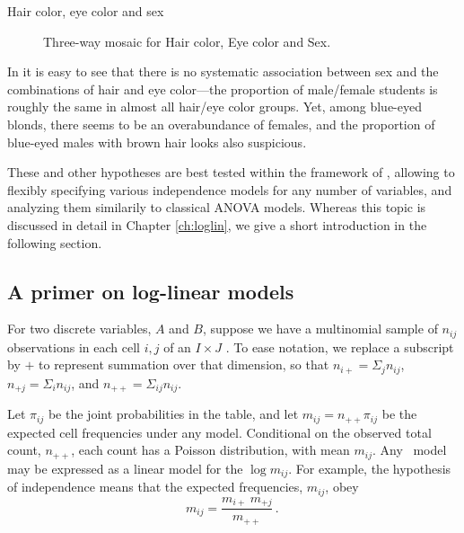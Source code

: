 \documentclass[10pt,krantz2]{krantz}\usepackage[]{graphicx}\usepackage[]{color}
\newenvironment{knitrout}{}{} %
\renewenvironment{knitrout}{\small\renewcommand{\baselinestretch}{.85}}{} %
\begin{document}
\begin{Example}[HEC1]{Hair color, eye color and sex}
\begin{knitrout}
\begin{figure}[!htb]
\caption[Three-way mosaic for Hair color, Eye color and Sex]{Three-way mosaic for Hair color, Eye color and Sex.\label{fig:HEC-mos1b}}
\end{figure}


\end{knitrout}
In  it is easy to
see that there is no systematic association between sex
and the combinations of hair and eye color---the proportion of
male/female students is roughly the same in almost all hair/eye color
groups. Yet, among blue-eyed blonds, there seems to be an
overabundance of females, and the proportion of blue-eyed males
with brown hair looks also suspicious.
\end{Example}
These and other hypotheses are best tested within the framework 
of , allowing to flexibly specifying
various independence models for any number of variables,
and analyzing them similarily to classical
ANOVA models. Whereas this topic is discussed in detail
in Chapter \ref{ch:loglin}, we give a short introduction in the following section.

\subsection{A primer on log-linear models}\label{sec:loglinprimer}

For two discrete variables, $A$ and $B$, suppose we have a multinomial sample of $n_{ij}$ observations in each cell $i,j$ of an $I \times J$
\ctab.   To ease notation, we replace a subscript by $+$ to represent
summation over that dimension, so that $n_{i+} = \Sigma_j n_{ij}$,
$n_{+j} = \Sigma_i n_{ij}$, and $n_{++} = \Sigma_{ij} n_{ij}$.

Let $\pi_{ij}$ be the joint probabilities in the table, and let
$m_{ij} = n_{++} \pi_{ij}$ be the expected cell frequencies under
any model.
Conditional on the observed total count, $n_{++}$,
each count has a Poisson distribution, with mean $m_{ij}$.
Any \loglin\ model may be expressed as a linear model for the $\log m_{ij}$.
For
example, the hypothesis of independence means that the expected
frequencies, \(m_{ij}\), obey
\begin{equation*}%
  m_{ij} = \frac{ m_{i+} \:  m_{+j} } {m_{++}}
  \period
\end{equation*}
\end{document}
